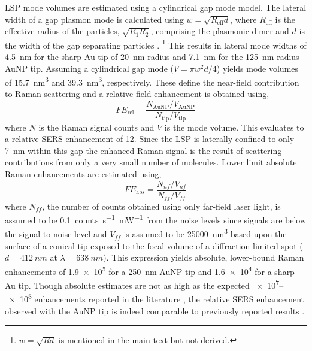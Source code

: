 \documentclass{article}
\begin{document}
LSP mode volumes are estimated using a cylindrical gap mode model. The lateral width of a gap plasmon mode is calculated using $w=\sqrt{R_{\mathrm{eff}}d}$, where $R_{\mathrm{eff}}$ is the effective radius of the particles, $\sqrt{R_1R_2}$, comprising the plasmonic dimer and $d$ is the width of the gap separating particles \cite{romero2006}.
\footnote{$w=\sqrt{Rd}$ is mentioned in the main text but not derived.}
This results in lateral mode widths of \SI{4.5}{nm} for the sharp Au tip of \SI{20}{nm} radius and \SI{7.1}{nm} for the \SI{125}{nm} radius AuNP tip. Assuming a cylindrical gap mode ($V=\pi w^2d/4$) yields mode volumes of \SI{15.7}{nm\cubed} and \SI{39.3}{nm\cubed}, respectively. These define the near-field contribution to Raman scattering and a relative field enhancement is obtained using,
\begin{equation}
	\mathit{FE}_{\mathrm{rel}} = \frac{N_{\mathrm{AuNP}} / V_{\mathrm{AuNP}}}{N_{\mathrm{tip}} / V_{\mathrm{tip}}}
\end{equation}
where $N$ is the Raman signal counts and $V$ is the mode volume. This evaluates to a relative SERS enhancement of 12.
Since the LSP is laterally confined to only \SI{7}{nm} within this gap the enhanced Raman signal is the result of scattering contributions from only a very small number of molecules. Lower limit absolute Raman enhancements are estimated using,
\begin{equation}
	\mathit{FE}_{\mathrm{abs}} = \frac{N_{nf} / V_{nf}}{N_{ff} / V_{ff}}
\end{equation}
where $N_{ff}$, the number of counts obtained using only far-field laser light, is assumed to be \SI{0.1}{counts.s^{-1}.mW^{-1}} from the noise levels since signals are below the signal to noise level and $V_{ff}$ is assumed to be \SI{25000}{nm\cubed} based upon the surface of a conical tip exposed to the focal volume of a diffraction limited spot ($d = \SI{412}{nm}$ at $\lambda = \SI{638}{nm}$). %
This expression yields absolute, lower-bound Raman enhancements of \num{1.9e5} for a \SI{250}{nm} AuNP tip and \num{1.6e4} for a sharp Au tip. Though absolute estimates are not as high as the expected \num{e7}--\num{e8} enhancements reported in the literature \cite{pettinger2012}, the relative SERS enhancement observed with the AuNP tip is indeed comparable to previously reported results \cite{umakoshi2012}.
\end{document}
